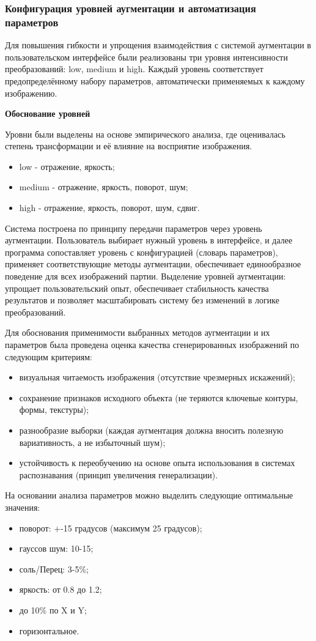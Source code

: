 
\subsubsection{Конфигурация уровней аугментации и автоматизация параметров}

Для повышения гибкости и упрощения взаимодействия с системой аугментации в пользовательском интерфейсе были реализованы три уровня интенсивности преобразований: low, medium и high. Каждый уровень соответствует предопределённому набору параметров, автоматически применяемых к каждому изображению.

\textbf{Обоснование уровней}

Уровни были выделены на основе эмпирического анализа, где оценивалась степень трансформации и её влияние на восприятие изображения. %
\begin{itemize}
	\item low - отражение, яркость;
	\item medium - отражение, яркость, поворот, шум;
	\item high - отражение, яркость, поворот, шум, сдвиг.
\end{itemize}
	

Система построена по принципу передачи параметров через уровень аугментации. Пользователь выбирает нужный уровень в интерфейсе, и далее программа сопоставляет уровень с конфигурацией (словарь параметров), применяет соответствующие методы аугментации, обеспечивает единообразное поведение для всех изображений партии. Выделение уровней аугментации: упрощает пользовательский опыт, обеспечивает стабильность качества результатов и позволяет масштабировать систему без изменений в логике преобразований.

Для обоснования применимости выбранных методов аугментации и их параметров была проведена оценка качества сгенерированных изображений по следующим критериям:
\begin{itemize}
	\item визуальная читаемость изображения (отсутствие чрезмерных искажений);
	\item сохранение признаков исходного объекта (не теряются ключевые контуры, формы, текстуры);
	\item разнообразие выборки (каждая аугментация должна вносить полезную вариативность, а не избыточный шум);
	\item устойчивость к переобучению на основе опыта использования в системах распознавания (принцип увеличения генерализации).
\end{itemize}

На основании анализа параметров можно выделить следующие оптимальные значения:

\begin{itemize}
	\item поворот: +-15 градусов (максимум 25 градусов);
	\item гауссов шум: 10-15;
	\item соль/Перец: 3-5\%;
	\item яркость: от 0.8 до 1.2;
	\item до 10\% по X и Y;
	\item горизонтальное.
\end{itemize}
